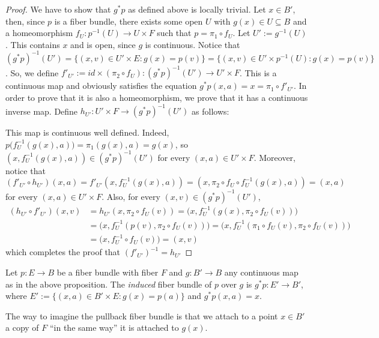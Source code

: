 \begin{proof} We have to show that $g^*p$ as defined above is locally trivial. Let $x\in B'$, then, since $p$ is a fiber bundle, there exists some open $U$ with $g(x)\in U\subseteq B$ and a homeomorphism $f_U:p^{-1}(U)\to U\times F$ such that $p=\pi_1\circ f_U$. Let $U':=g^{-1}(U)$. This contains $x$ and is open, since $g$ is continuous. Notice that
$(g^*p)^{-1}(U')=\{(x,v)\in U'\times E: g(x)=p(v)\}
=\{(x,v)\in U'\times p^{-1}(U):g(x)=p(v)\}$.
So, we define $f'_{U'}:= id\times(\pi_2\circ f_U):(g^*p)^{-1}(U')\to U'\times F$. This is a continuous map and obviously satisfies the equation $g^*p(x,a)=x=\pi_1\circ f'_{U'}$. In order to prove that it is also a homeomorphism, we prove that it has a continuous inverse map. Define $h_{U'}:U'\times F\to (g^*p)^{-1}(U')$ as follows:
\begin{center}
\end{center}
This map is continuous well defined. Indeed, $p\big(f_U^{-1}(g(x),a)\big)=\pi_1(g(x),a)=g(x)$, so $(x,f_U^{-1}(g(x),a))\in (g^*p)^{-1}(U')$ for every $(x,a)\in U'\times F$. Moreover, notice that $(f'_{U'}\circ h_{U'})(x,a)=f'_{U'}(x,f_U^{-1}(g(x),a))=(x,\pi_2\circ f_U\circ f_U^{-1}(g(x),a))=(x,a)$ for every $(x,a)\in U'\times F$. Also, for every $(x,v)\in (g^*p)^{-1}(U')$,
\begin{align*}
(h_{U'}\circ f'_{U'})(x,v)&=h_{U'}(x,\pi_2\circ f_U(v))=\big(x,f_U^{-1}(g(x),\pi_2\circ f_U(v))\big)\\
&=\big(x,f_U^{-1}(p(v),\pi_2\circ f_U(v))\big)=\big(x,f_U^{-1}(\pi_1\circ f_U(v),\pi_2\circ f_U(v))\big)\\
&=\big(x,f_U^{-1}\circ f_U(v)\big)=(x,v)
\end{align*}
which completes the proof that $(f'_{U'})^{-1}=h_{U'}$
\end{proof}

\begin{definition} Let $p:E\to B$ be a fiber bundle with fiber $F$ and $g:B'\to B$ any continuous map as in the above proposition. The \emph{induced} fiber bundle of $p$ over $g$ is $g^*p:E'\to B'$, where $E':=\{(x,a)\in B'\times E:g(x)=p(a)\}$ and $g^*p(x,a)=x$.
\end{definition}
The way to imagine the pullback fiber bundle is that we attach to a point $x\in B'$ a copy of $F$ ``in the same way'' it is attached to $g(x)$.

